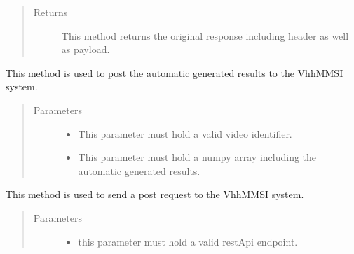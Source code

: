 \documentclass[letterpaper,10pt,english,openany,oneside]{sphinxmanual}
\begin{document}
\begin{fulllineitems}
\begin{fulllineitems}
\begin{quote}
\begin{description}
\item[{Returns}] \leavevmode
This method returns the original response including header as well as payload.

\end{description}\end{quote}

\end{fulllineitems}


\begin{fulllineitems}
\label{\detokenize{VhhRestApi:VhhRestApi.VhhRestApi.postAutomaticResults}}
This method is used to post the automatic generated results to the VhhMMSI system.
\begin{quote}\begin{description}
\item[{Parameters}] \leavevmode\begin{itemize}
\item {} 
 \textendash{} This parameter must hold a valid video identifier.

\item {} 
 \textendash{} This parameter must hold a numpy array including the automatic generated results.

\end{itemize}

\end{description}\end{quote}

\end{fulllineitems}


\begin{fulllineitems}
\label{\detokenize{VhhRestApi:VhhRestApi.VhhRestApi.postRequest}}
This method is used to send a post request to the Vhh\sphinxhyphen{}MMSI system.
\begin{quote}\begin{description}
\item[{Parameters}] \leavevmode\begin{itemize}
\item {} 
 \textendash{} this parameter must hold a valid restApi endpoint.


\end{itemize}
\end{description}
\end{quote}
\end{fulllineitems}
\end{fulllineitems}
\end{document}
